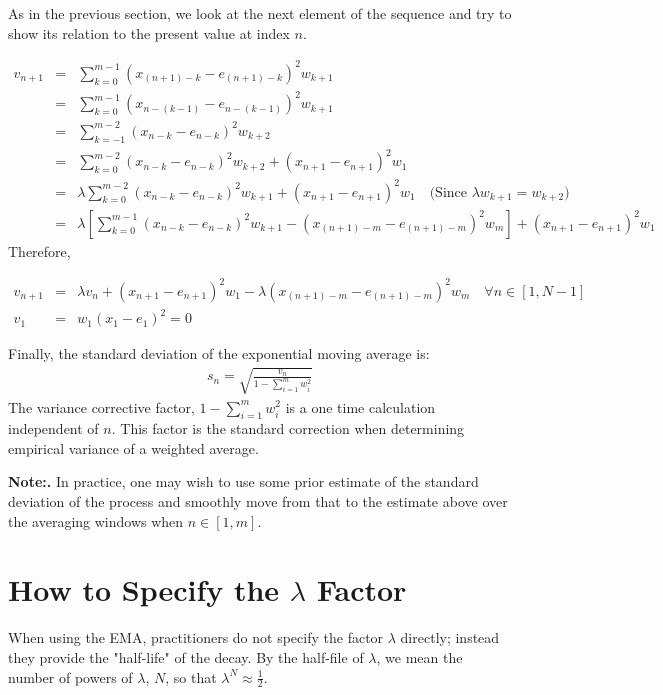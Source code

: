 \documentclass{article}
\begin{document}
As in the previous section, we look at the next element of the sequence 
and try to show its relation to the present value at index $n$.

\begin{eqnarray*}
v_{n+1} & = & \sum_{k=0}^{m-1} (x_{(n+1)-k} - e_{(n+1)-k})^2  w_{k+1} \\
        & = & \sum_{k=0}^{m-1} (x_{n-(k-1)} - e_{n-(k-1)})^2  w_{k+1} \\
        & = & \sum_{k=-1}^{m-2} (x_{n-k} - e_{n-k})^2  w_{k+2} \\
        & = & \sum_{k=0}^{m-2} (x_{n-k} - e_{n-k})^2  w_{k+2}  + ( x_{n+1} - e_{n+1} )^2 w_1 \\
        & = & \lambda \sum_{k=0}^{m-2} (x_{n-k} - e_{n-k})^2  w_{k+1}  + ( x_{n+1} - e_{n+1} )^2 w_1  \quad \text{(Since $\lambda w_{k+1} = w_{k+2}$)} \\
        & = & \lambda \left[ \sum_{k=0}^{m-1} (x_{n-k} - e_{n-k})^2  w_{k+1} - ( x_{(n+1)-m} - e_{(n+1)-m} )^2 w_m \right]
            + ( x_{n+1} - e_{n+1} )^2 w_1 
\end{eqnarray*}
Therefore,

\begin{eqnarray}
    v_{n+1} & = & \lambda v_n + ( x_{n+1} - e_{n+1} )^2 w_1 - \lambda ( x_{(n+1)-m} - e_{(n+1)-m} )^2 w_m \quad \forall n \in [1, N-1] \\
    v_1  & = & w_1 (x_1 - e_1)^2 = 0
\end{eqnarray}

Finally, the standard deviation of the exponential moving average is:
\begin{eqnarray}
    s_{n} = \sqrt{\frac{v_n}{1 - \sum_{i=1}^m w_i^2}} 
\end{eqnarray}
The variance corrective factor, $1 - \sum_{i=1}^m w_i^2$ is a 
one time calculation independent of $n$. This factor is the standard 
correction when determining empirical variance of a weighted average.

{\bf Note:\/.} In practice, one may wish to use some prior estimate of the standard deviation of the process
and smoothly move from that to the estimate above over the averaging windows when $n \in [1, m]$.


\section{How to Specify the $\lambda$ Factor}
When using the EMA, practitioners do not specify the factor $\lambda$ directly; 
instead they provide the "half-life" of the decay.
By the half-file of $\lambda$, we mean the number of powers of $\lambda$, $N$, so that
$\lambda^N \approx \frac{1}{2}$. 
\end{document}
